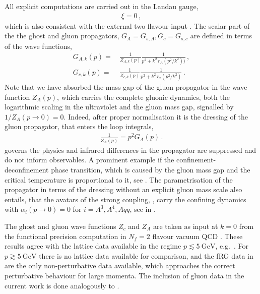 \documentclass[aps,twocolumn,prd,superscriptaddress]{revtex4-2}
\begin{document}
All explicit computations are carried out in the Landau gauge, 
%
\begin{align} 
	\xi=0\,,
	\label{eq:LandauGauge}
\end{align}
%
which is also consistent with the external two flavour input \cite{Cyrol:2017ewj}. The scalar part of the the ghost and gluon propagators, $G_A=G_{s,A}, G_c=G_{s,c}$ are defined in terms of the wave functions, 
%
\begin{align} \nonumber 
	G_{A,k}(p)=&\, \frac{1}{Z_{A,k}(p)} \frac{1}{p^2 + k^2\,r_A(p^2/k^2))} \,,\\[2ex]
	G_{c,k}(p)= &\, \frac{1}{Z_{c,k}(p)} \frac{1}{p^2 + k^2 \,r_x(p^2/k^2)} \,. 
\label{eq:Gh+glZs}
\end{align}
%
Note that we have absorbed the mass gap of the gluon propagator in the wave function $Z_A(p)$, which carries the complete gluonic dynamics, both the logarithmic scaling in the ultraviolet and the gluon mass gap, signalled by $1/Z_A(p\to 0) =0$. Indeed, after proper normalisation it is the dressing of the gluon propagator, that enters the loop integrals, 
%
\begin{align}
	\frac{1}{Z_A(p)} = p^2 G_A(p)\,. 
	\label{eq:GluonDressing}
\end{align} 
%
 governs the physics and infrared differences in the propagator are suppressed and do not inform observables. A prominent example if the confinement-deconfinement phase transition, which is caused by the gluon mass gap and the critical temperature is proportional to it, see \cite{Braun:2007bx, Fister:2013bh, Herbst:2015ona}. The parametrisation of the propagator in terms of the dressing without an explicit gluon mass scale also entails, that the avatars of the strong coupling, , carry the confining dynamics with $\alpha_i(p\to 0)=0$ for $i=A^3,A^4, A q \bar q$, see  in .  

The ghost and gluon wave functions $Z_c$ and $Z_A$ are taken as input at $k=0$ from the functional precision computation in $N_f=2$ flavour vacuum QCD \cite{Cyrol:2017ewj}. These results agree with the lattice data available in the regime $p\lesssim \qty{5}{\GeV}$, e.g.~\cite{Sternbeck:2012qs}. For $p\gtrsim \qty{5}{\GeV}$ there is no lattice data available for comparison, and the fRG data in \cite{Cyrol:2017ewj} are the only non-perturbative data available, which approaches the correct perturbative behaviour for large momenta. The inclusion of gluon data in the current work is done analogously to \cite{Braun:2014ata, Fu:2019hdw}.
\end{document}
